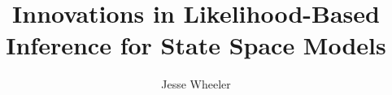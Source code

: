 \documentclass[thesis]{thesis-umich}\usepackage[]{graphicx}\usepackage[]{xcolor}
\title{Innovations in Likelihood-Based Inference for State Space Models}
\author{Jesse Wheeler}
\begin{document}





\appendix
% 






% 

\normalem

\end{document}
